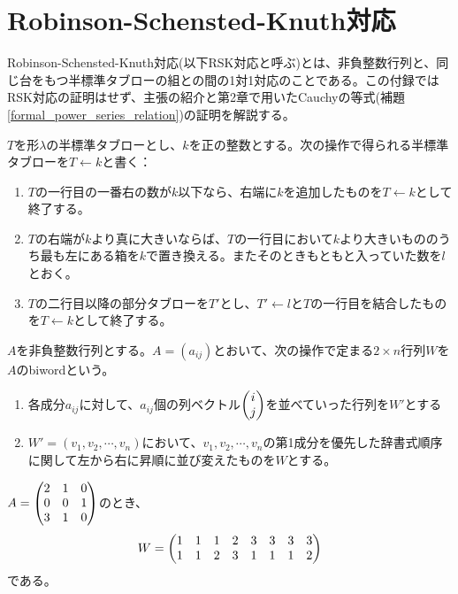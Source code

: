 \documentclass{ltjsreport}
\begin{document}
\appendix
\chapter{Robinson-Schensted-Knuth対応}

Robinson-Schensted-Knuth対応(以下RSK対応と呼ぶ)とは、非負整数行列と、同じ台をもつ半標準タブローの組との間の1対1対応のことである。この付録ではRSK対応の証明はせず、主張の紹介と第2章で用いたCauchyの等式(補題\ref{formal_power_series_relation})の証明を解説する。

\begin{defin}[行挿入]
  $T$を形$\lambda$の半標準タブローとし、$k$を正の整数とする。次の操作で得られる半標準タブローを$T\leftarrow k$と書く：
  \begin{enumerate}
    \item $T$の一行目の一番右の数が$k$以下なら、右端に$k$を追加したものを$T\leftarrow k$として終了する。
    \item $T$の右端が$k$より真に大きいならば、$T$の一行目において$k$より大きいもののうち最も左にある箱を$k$で置き換える。またそのときもともと入っていた数を$l$とおく。
    \item $T$の二行目以降の部分タブローを$T'$とし、$T'\leftarrow l$と$T$の一行目を結合したものを$T\leftarrow k$として終了する。
  \end{enumerate}
\end{defin}

\begin{defin}
  $A$を非負整数行列とする。$A=(a_{ij})$とおいて、次の操作で定まる$2\times n$行列$W$を$A$のbiwordという。
  \begin{enumerate}
    \item 各成分$a_{ij}$に対して、$a_{ij}$個の列ベクトル$\begin{pmatrix} i\\j \end{pmatrix}$を並べていった行列を$W'$とする
    \item $W'=(v_1,v_2,\cdots,v_n)$において、$v_1,v_2,\cdots,v_n$の第1成分を優先した辞書式順序に関して左から右に昇順に並び変えたものを$W$とする。
  \end{enumerate}
\end{defin}

\begin{eg}
  $A=\begin{pmatrix} 2 & 1 & 0\\0 &0 &1\\3 &1 &0 \end{pmatrix}$のとき、
  \[
  W=\begin{pmatrix} 
    1 & 1 & 1 & 2 & 3 & 3 & 3 & 3\\
    1 & 1 & 2 & 3 & 1 & 1 & 1 & 2
   \end{pmatrix}
  \]
  である。
\end{eg}
\end{document}
